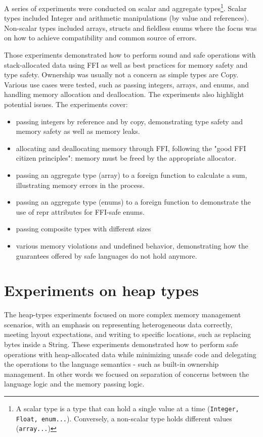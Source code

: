 \documentclass[nomenclature, english, bibtex]{kththesis}
\begin{document}
A series of experiments were conducted on scalar and aggregate types\footnote{A scalar type is a type that can hold a single value at a time (\texttt{Integer, Float, enum...}). Conversely, a non-scalar type holds different values (\texttt{array...})}. Scalar types included Integer and arithmetic manipulations (by value and references). Non-scalar types included arrays, structs and fieldless enums where the focus was on how to achieve compatibility and common source of errors.

Those experiments demonstrated how to perform sound and safe operations with stack-allocated data using \gls{FFI}
as well as best practices for memory safety and type safety. Ownership was usually not a concern as simple types are Copy.
Various use cases were tested, such as passing integers, arrays, and enums, and handling memory allocation and deallocation. The experiments also highlight potential issues. The experiments cover:

\begin{itemize}
    \item passing integers by reference and by copy, demonstrating type safety and memory safety as well as memory leaks.
    \item allocating and deallocating memory through FFI, following the "good FFI citizen principles"\cite{gjengset_rust_2021}: memory must be freed by the appropriate allocator.
    \item passing an aggregate type (array) to a foreign function to calculate a sum, illustrating memory errors in the process.
     \item passing an aggregate type (enums) to a foreign function to demonstrate the use of repr attributes for FFI-safe enums.
     \item passing composite types with different sizes
     \item various memory violations and undefined behavior, demonstrating how the guarantees offered by safe languages do not hold anymore.
\end{itemize}
 
\section{Experiments on heap types}
The heap-types experiments focused on more complex memory management scenarios, with an emphasis on representing heterogeneous data correctly, meeting layout expectations, and writing to specific locations, such as replacing bytes inside a String. These experiments demonstrated how to perform safe operations with heap-allocated data while minimizing unsafe code and delegating the operations to the language semantics - such as built-in ownership management. In other words we focused on separation of concerns between the language logic and the memory passing logic.
\end{document}
